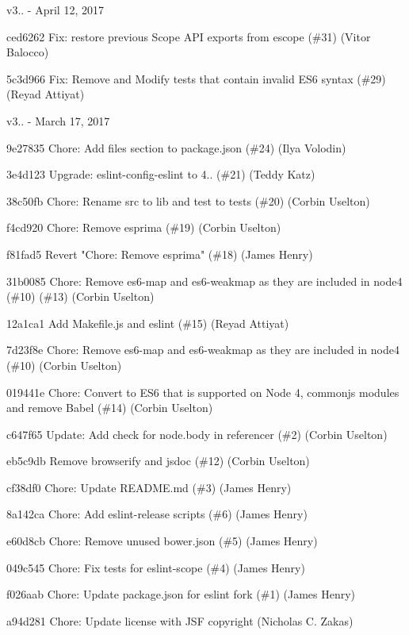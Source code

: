 v3.. -\/ April 12, 2017


\begin{DoxyItemize}
\item ced6262 Fix\+: restore previous Scope API exports from escope (\#31) (Vitor Balocco)
\item 5c3d966 Fix\+: Remove and Modify tests that contain invalid ES6 syntax (\#29) (Reyad Attiyat)
\end{DoxyItemize}

v3.. -\/ March 17, 2017


\begin{DoxyItemize}
\item 9e27835 Chore\+: Add files section to package.\+json (\#24) (Ilya Volodin)
\item 3e4d123 Upgrade\+: eslint-\/config-\/eslint to 4.. (\#21) (Teddy Katz)
\item 38c50fb Chore\+: Rename src to lib and test to tests (\#20) (Corbin Uselton)
\item f4cd920 Chore\+: Remove esprima (\#19) (Corbin Uselton)
\item f81fad5 Revert "{}\+Chore\+: Remove esprima"{} (\#18) (James Henry)
\item 31b0085 Chore\+: Remove es6-\/map and es6-\/weakmap as they are included in node4 (\#10) (\#13) (Corbin Uselton)
\item 12a1ca1 Add Makefile.\+js and eslint (\#15) (Reyad Attiyat)
\item 7d23f8e Chore\+: Remove es6-\/map and es6-\/weakmap as they are included in node4 (\#10) (Corbin Uselton)
\item 019441e Chore\+: Convert to ES6 that is supported on Node 4, commonjs modules and remove Babel (\#14) (Corbin Uselton)
\item c647f65 Update\+: Add check for node.\+body in referencer (\#2) (Corbin Uselton)
\item eb5c9db Remove browserify and jsdoc (\#12) (Corbin Uselton)
\item cf38df0 Chore\+: Update README.\+md (\#3) (James Henry)
\item 8a142ca Chore\+: Add eslint-\/release scripts (\#6) (James Henry)
\item e60d8cb Chore\+: Remove unused bower.\+json (\#5) (James Henry)
\item 049c545 Chore\+: Fix tests for eslint-\/scope (\#4) (James Henry)
\item f026aab Chore\+: Update package.\+json for eslint fork (\#1) (James Henry)
\item a94d281 Chore\+: Update license with JSF copyright (Nicholas C. Zakas) 
\end{DoxyItemize}